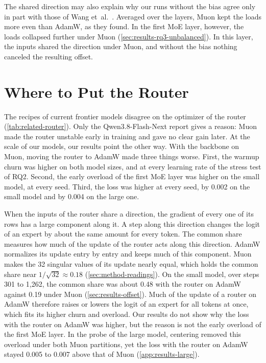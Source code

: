The shared direction may also explain why our runs without the bias agree only in part with those of Wang et~al.~\cite{wang2026depth}. Averaged over the layers, Muon kept the loads more even than AdamW, as they found. In the first MoE layer, however, the loads collapsed further under Muon (\cref{sec:results-rq3-unbalanced}). In this layer, the inputs shared the direction under Muon, and without the bias nothing canceled the resulting offset.

\section{Where to Put the Router}
\label{sec:discussion-router}
The recipes of current frontier models disagree on the optimizer of the router (\cref{tab:related-router}). Only the Qwen3.8-Flash-Next report gives a reason: Muon made the router unstable early in training and gave no clear gain later. At the scale of our models, our results point the other way. With the backbone on Muon, moving the router to AdamW made three things worse. First, the warmup churn was higher on both model sizes, and at every learning rate of the stress test of RQ2. Second, the early overload of the first MoE layer was higher on the small model, at every seed. Third, the loss was higher at every seed, by 0.002 on the small model and by 0.004 on the large one.

When the inputs of the router share a direction, the gradient of every one of its rows has a large component along it. A step along this direction changes the logit of an expert by about the same amount for every token. The common share measures how much of the update of the router acts along this direction. AdamW normalizes its update entry by entry and keeps much of this component. Muon makes the 32 singular values of its update nearly equal, which holds the common share near $1 / \sqrt{32} \approx 0.18$ (\cref{sec:method-readings}). On the small model, over steps 301 to 1,262, the common share was about 0.48 with the router on AdamW against 0.19 under Muon (\cref{sec:results-offset}). Much of the update of a router on AdamW therefore raises or lowers the logit of an expert for all tokens at once, which fits its higher churn and overload. Our results do not show why the loss with the router on AdamW was higher, but the reason is not the early overload of the first MoE layer. In the probe of the large model, centering removed this overload under both Muon partitions, yet the loss with the router on AdamW stayed 0.005 to 0.007 above that of Muon (\cref{app:results-large}).

